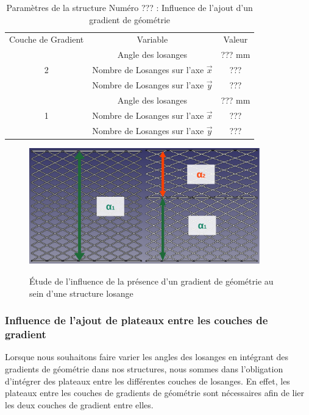\documentclass[a4paper]{article}
\begin{document}
	\begin{table}[H]
		\centering
		\begin{tabular}{|c|c|c|}
			\hline
			\rowcolor{Gray}
			\multicolumn{3}{c}{Structure de Référence}\\\hline
			\rowcolor{Gray}
			Couche de Gradient & Variable & Valeur\\
			\hline\hline
			& \textcolor[rgb]{1,0,0}{Angle des losanges} & \textcolor[rgb]{1,0,0}{??? mm}\\
			\textcolor[rgb]{1,0,0}{2} & \textcolor[rgb]{1,0,0}{Nombre de Losanges sur l'axe $\vec{x}$} & \textcolor[rgb]{1,0,0}{???}\\
			& \textcolor[rgb]{1,0,0}{Nombre de Losanges sur l'axe $\vec{y}$} & \textcolor[rgb]{1,0,0}{???}\\
			\hline
			& \textcolor[rgb]{0,0.5,0}{Angle des losanges} & \textcolor[rgb]{0,0.5,0}{??? mm}\\
			\textcolor[rgb]{0,0.5,0}{1} & \textcolor[rgb]{0,0.5,0}{Nombre de Losanges sur l'axe $\vec{x}$} & \textcolor[rgb]{0,0.5,0}{???}\\
			& \textcolor[rgb]{0,0.5,0}{Nombre de Losanges sur l'axe $\vec{y}$} & \textcolor[rgb]{0,0.5,0}{???}\\
			\hline
		\end{tabular}
		\caption{Paramètres de la structure Numéro ??? : Influence de l'ajout d'un gradient de géométrie}
	\end{table}
	
	\begin{figure}[H]
		\centering
		\includegraphics[width=10cm]{Images/6/gradgeom/gradgeom.pdf}\\
		\caption{Étude de l’influence de la présence d'un gradient de géométrie au sein d'une structure losange}
		\label{gradgeom}
	\end{figure}
	\newpage
	
	\subsubsection{Influence de l'ajout de plateaux entre les couches de gradient}
	\hspace{0.5cm}Lorsque nous souhaitons faire varier les angles des losanges en intégrant des gradients de géométrie dans nos structures, nous sommes dans l’obligation d’intégrer des plateaux entre les différentes couches de losanges. En effet, les plateaux entre les couches de gradients de géométrie sont nécessaires afin de lier les deux couches de gradient entre elles.
	
\end{document}
